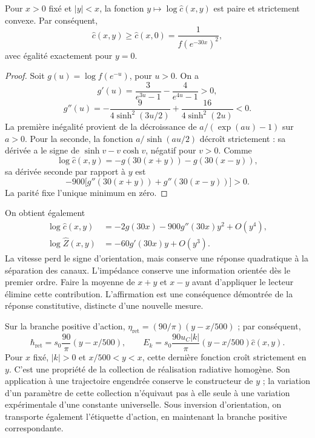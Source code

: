 \begin{proposition}
\label{md:hib:proposicion-convexidad}
Pour $x>0$ fixé et $|y|<x$, la fonction
$y\mapsto\log\widehat c(x,y)$ est paire et strictement convexe.
Par conséquent,
\begin{equation}
 \widehat c(x,y)\geq\widehat c(x,0)
 =\frac{1}{f(e^{-30x})^2},
 \label{md:hib:cota-velocidad}
\end{equation}
avec égalité exactement pour $y=0$.
\end{proposition}
\begin{proof}
Soit $g(u)=\log f(e^{-u})$, pour $u>0$. On a
\begin{equation}
 g'(u)=\frac{3}{e^{3u}-1}-\frac{4}{e^{4u}-1}>0,
 \label{md:hib:derivada-g}
\end{equation}
\begin{equation}
 g''(u)=-\frac{9}{4\sinh^2(3u/2)}
 +\frac{16}{4\sinh^2(2u)}<0.
 \label{md:hib:segunda-g}
\end{equation}
La première inégalité provient de la décroissance de
$a/(\exp(au)-1)$ sur $a>0$. Pour la seconde, la fonction
$a/\sinh(au/2)$ décroît strictement : sa dérivée a le signe de
$\sinh v-v\cosh v$, négatif pour $v>0$. Comme
\[
 \log\widehat c(x,y)=-g(30(x+y))-g(30(x-y)),
\]
sa dérivée seconde par rapport à $y$ est
\begin{equation}
 -900\bigl[g''(30(x+y))+g''(30(x-y))\bigr]>0.
 \label{md:hib:segunda-velocidad}
\end{equation}
La parité fixe l’unique minimum en zéro.
\end{proof}
On obtient également
\begin{equation}
 \begin{aligned}
 \log\widehat c(x,y)
 &=-2g(30x)-900g''(30x)y^2+O(y^4),\\
 \log\widehat Z(x,y)
 &=-60g'(30x)y+O(y^3).
 \end{aligned}
 \label{md:hib:desarrollos-canales}
\end{equation}
La vitesse perd le signe d’orientation, mais conserve une réponse
quadratique à la séparation des canaux. L’impédance conserve une information
orientée dès le premier ordre. Faire la moyenne de $x+y$ et $x-y$ avant d’appliquer le
lecteur élimine cette contribution. L’affirmation est une conséquence
démontrée de la réponse constitutive, distincte d’une nouvelle mesure.

Sur la branche positive d’action,
$\eta_{\mathrm{ret}}=(90/\pi)(y-x/500)$ ; par conséquent,
\begin{equation}
 \hbar_{\mathrm{ret}}=s_0\frac{90}{\pi}(y-x/500),\qquad
 E_k=s_0\frac{90u_C|k|}{\pi}(y-x/500)\widehat c(x,y).
 \label{md:hib:energia-angular}
\end{equation}
Pour $x$ fixé, $|k|>0$ et $x/500<y<x$, cette dernière fonction croît
strictement en $y$. C’est une propriété de la collection de réalisation
radiative homogène. Son application à une trajectoire engendrée conserve le
constructeur de $y$ ; la variation d’un paramètre de cette collection n’équivaut pas
à elle seule à une variation expérimentale d’une constante universelle.
Sous inversion d’orientation, on transporte également l’étiquette d’action,
en maintenant la branche positive correspondante.

